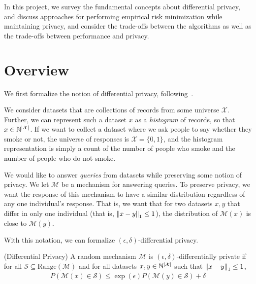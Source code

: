 \documentclass{article} %
\begin{document}
In this project, we survey the fundamental concepts about differential privacy,
and discuss approaches for performing empirical risk minimization while
maintaining privacy, and consider the trade-offs between the algorithms as well
as the trade-offs between performance and privacy.


\section{Overview}\label{overview}
We first formalize the notion of differential privacy, following~\cite{dwork2014algorithmic}.

We consider datasets that are collections of records from some
universe $\mathcal{X}$. Further, we can represent such a dataset $x$ as a
\textit{histogram} of records, so that $x \in \mathbb{N}^{\left\lvert\mathcal{X}\right\rvert}$. If we want
to collect a dataset where we ask people to say whether they smoke or not, the
universe of responses is $\mathcal{X} = \{0, 1\}$, and the histogram
representation is simply a count of the number of people who smoke and the
number of people who do not smoke.

We would like to answer \textit{queries} from datasets while preserving some
notion of privacy. We let $\mathcal{M}$ be a mechanism for answering
queries. To preserve privacy, we want the response of this mechanism
to have a similar distribution regardless of any one individual's response.
That is, we want that for two datasets $x, y$ that differ in only one
individual (that is, $\left\lVert x - y\right\rVert_1 \leq 1$), the distribution of
$\mathcal{M}(x)$ is close to $\mathcal{M}(y)$.

With this notation, we can formalize $(\epsilon, \delta)$-differential privacy.

\begin{definition}{(Differential Privacy)}
A random mechanism $\mathcal{M}$ is $(\epsilon, \delta)$-differentially private
if for all $\mathcal{S} \subseteq \textrm{Range}(\mathcal{M})$ and for all
datasets $x, y \in \mathbb{N}^{\left\lvert\mathcal{X}\right\rvert}$
such that $\left\lVert x - y\right\rVert_1 \leq 1$,
\begin{align*}
P(\mathcal{M}(x) \in \mathcal{S}) \leq \exp{(\epsilon)} P(\mathcal{M}(y) \in \mathcal{S}) + \delta
\end{align*}
\end{definition}
\end{document}
